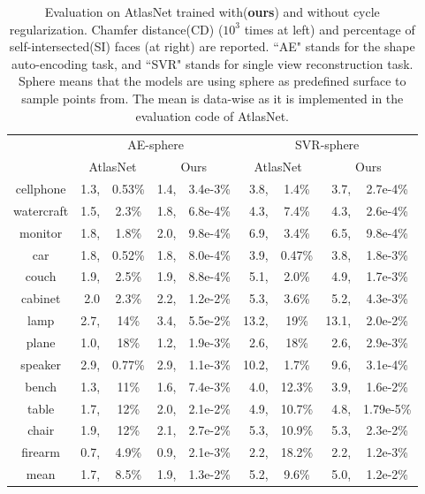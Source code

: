 \begin{table}
	\caption{Evaluation on AtlasNet trained with(\textbf{ours}) and without cycle regularization. Chamfer distance(CD) ($10^3$ times at left) and percentage of self-intersected(SI) faces (at right) are reported. ``AE" stands for the shape auto-encoding task, and ``SVR" stands for single view reconstruction task. Sphere means that the models are using sphere as predefined surface to sample points from. The mean is data-wise as it is implemented in the evaluation code of AtlasNet.}
	\label{tab:atlas}
	\centering
	\begin{tabular}{|c|rc|rc|rc|rc|}
		\hline 
		~&\multicolumn{4}{c|}{AE-sphere}&\multicolumn{4}{c|}{SVR-sphere}\\
		\cline{2-9}
		~& \multicolumn{2}{c|}{AtlasNet} & \multicolumn{2}{c|}{Ours} & \multicolumn{2}{c|}{AtlasNet} & \multicolumn{2}{c|}{Ours} \\
		\hline
		cellphone&1.3,&0.53\%&1.4,&3.4e-3\%&3.8,&1.4\%&3.7,&2.7e-4\%\\
		watercraft&1.5,&2.3\%&1.8,&6.8e-4\%&4.3,&7.4\%&4.3,&2.6e-4\%\\
		monitor&1.8,&1.8\%&2.0,&9.8e-4\%&6.9,&3.4\%&6.5,&9.8e-4\%\\
		car&1.8,&0.52\%&1.8,&8.0e-4\%&3.9,&0.47\%&3.8,&1.8e-3\%\\
		couch&1.9,&2.5\%&1.9,&8.8e-4\%&5.1,&2.0\%&4.9,&1.7e-3\%\\
		cabinet&2.0&2.3\%&2.2,&1.2e-2\%&5.3,&3.6\%&5.2,&4.3e-3\%\\
		lamp&2.7,&14\%&3.4,&5.5e-2\%&13.2,&19\%&13.1,&2.0e-2\%\\
		plane&1.0,&18\%&1.2,&1.9e-3\%&2.6,&18\%&2.6,&2.9e-3\%\\
		speaker&2.9,&0.77\%&2.9,&1.1e-3\%&10.2,&1.7\%&9.6,&3.1e-4\%\\
		bench&1.3,&11\%&1.6,&7.4e-3\%&4.0,&12.3\%&3.9,&1.6e-2\%\\
		table&1.7,&12\%&2.0,&2.1e-2\%&4.9,&10.7\%&4.8,&1.79e-5\%\\
		chair&1.9,&12\%&2.1,&2.7e-2\%&5.3,&10.9\%&5.3,&2.3e-2\%\\
		firearm&0.7,&4.9\%&0.9,&2.1e-3\%&2.2,&18.2\%&2.2,&1.2e-3\%\\
		\hline
		mean &1.7,&8.5\%&1.9,& 1.3e-2\% &5.2,&9.6\%&5.0,&1.2e-2\%\\
		\hline
	\end{tabular}
\end{table}

